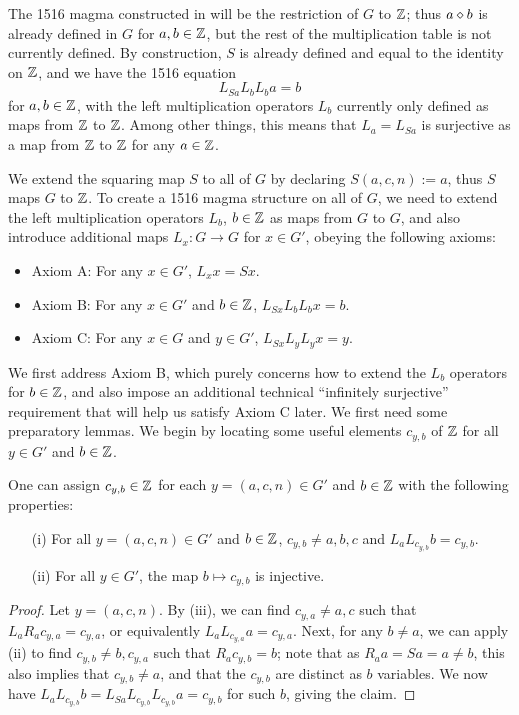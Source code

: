The 1516 magma constructed in  will be the restriction of $G$ to $\mathbb{Z}$; thus $a \diamond b$ is already defined in $G$ for $a,b \in \mathbb{Z}$, but the rest of the multiplication table is not currently defined.  By construction, $S$ is already defined and equal to the identity on $\mathbb{Z}$, and we have the 1516 equation
$$ L_{Sa} L_b L_b a = b$$
for $a,b \in \mathbb{Z}$, with the left multiplication operators $L_b$ currently only defined as maps from $\mathbb{Z}$ to $\mathbb{Z}$.  Among other things, this means that $L_a = L_{Sa}$ is surjective as a map from $\mathbb{Z}$ to $\mathbb{Z}$ for any $a \in \mathbb{Z}$.

We extend the squaring map $S$ to all of $G$ by declaring $S(a,c,n) := a$, thus $S$ maps $G$ to $\mathbb{Z}$.  To create a 1516 magma structure on all of $G$, we need to extend the left multiplication operators $L_b$, $b \in \mathbb{Z}$ as maps from $G$ to $G$, and also introduce additional maps $L_x: G \to G$ for $x \in G'$, obeying the following axioms:
\begin{itemize}
\item Axiom A: For any $x \in G'$, $L_x x = Sx$.
\item Axiom B: For any $x \in G'$ and $b \in \mathbb{Z}$, $L_{Sx} L_b L_b x = b$.
\item Axiom C: For any $x \in G$ and $y \in G'$, $L_{Sx} L_y L_y x = y$.
\end{itemize}

We first address Axiom B, which purely concerns how to extend the $L_b$ operators for $b \in \mathbb{Z}$, and also impose an additional technical ``infinitely surjective'' requirement that will help us satisfy Axiom C later.  We first need some preparatory lemmas.  We begin by locating some useful elements $c_{y,b}$ of $\mathbb{Z}$ for all $y \in G'$ and $b \in \mathbb{Z}$.

\begin{lemma}\label{aux}  One can assign $c_{y,b} \in \mathbb{Z}$ for each $y = (a,c,n) \in G'$ and $b \in \mathbb{Z}$ with the following properties:
\begin{itemize}
\item[(i)] For all $y = (a,c,n) \in G'$ and $b \in \mathbb{Z}$, $c_{y,b} \neq a,b,c$ and $L_a L_{c_{y,b}} b = c_{y,b}$.
\item[(ii)] For all $y \in G'$, the map $b \mapsto c_{y,b}$ is injective.
\end{itemize}
\end{lemma}

\begin{proof}  Let $y = (a,c,n)$.  By (iii), we can find $c_{y,a} \neq a,c$ such that $L_a R_a c_{y,a} = c_{y,a}$, or equivalently $L_a L_{c_{y,a}} a = c_{y,a}$.  Next, for any $b \neq a$, we can apply (ii) to find $c_{y,b} \neq b, c_{y,a}$ such that $R_a c_{y,b} = b$; note that as $R_a a = Sa = a \neq b$, this also implies that $c_{y,b} \neq a$, and that the $c_{y,b}$ are distinct as $b$ variables.  We now have $L_a L_{c_{y,b}} b = L_{Sa} L_{c_{y,b}} L_{c_{y,b}} a = c_{y,b}$ for such $b$, giving the claim.
\end{proof}

